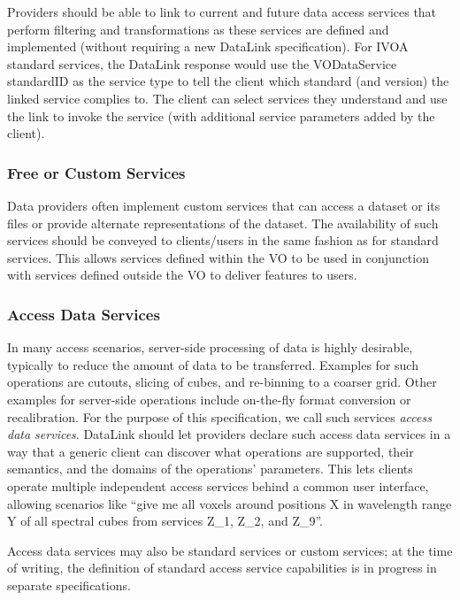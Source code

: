\documentclass[11pt,a4paper]{ivoa}
\begin{document}
Providers should be able to link to current and future data
access services that perform filtering and transformations as these
services are defined and implemented (without requiring a new DataLink
specification). For IVOA standard services, the DataLink response would
use the VODataService standardID as the service type to tell the client which
standard (and version) the linked service complies to. The client can
select services they understand and use the link to invoke the service
(with additional service parameters added by the client).


\subsubsection{Free or Custom Services}
\label{sec:useCustom}

Data providers often implement custom services that can access a dataset
or its files or provide alternate representations of the dataset. The
availability of such services should be conveyed to clients/users in
the same fashion as for standard services. This allows services defined
within the VO to be used in conjunction with services defined outside
the VO to deliver features to users.


\subsubsection{Access Data Services}

In many access scenarios, server-side processing of data is
highly desirable, typically to reduce the amount of data to be
transferred. Examples for such operations are cutouts, slicing of
cubes, and re-binning to a coarser grid. Other examples for server-side
operations include on-the-fly format conversion or recalibration. For
the purpose of this specification, we call such services
{\em access data services}.
DataLink should let providers declare such access data services
in a way that a generic client can discover what operations are supported,
their semantics, and the domains of the operations' parameters. This lets
clients operate multiple independent access services behind a common user
interface, allowing scenarios like ``give me all voxels around positions
X in wavelength range Y of all spectral cubes from services Z\_1, Z\_2,
and Z\_9''.

Access data services may also be standard services or custom services;
at the time of writing, the definition of standard access service
capabilities is in progress in separate specifications.
\end{document}
